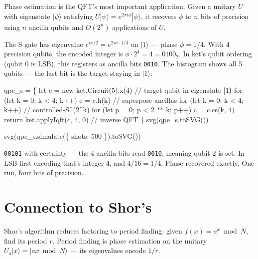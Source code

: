 \documentclass[
  11pt,
  letterpaper,
  oneside]{scrbook}
\newenvironment{Shaded}{\begin{snugshade}}{\end{snugshade}}
\newcommand{\NormalTok}[1]{\textcolor[rgb]{0.00,0.23,0.31}{#1}}
\begin{document}
Phase estimation is the QFT's most important application. Given a
unitary \(U\) with eigenstate \(|\psi\rangle\) satisfying
\(U|\psi\rangle = e^{2\pi i\phi}|\psi\rangle\), it recovers \(\phi\) to
\(n\) bits of precision using \(n\) ancilla qubits and \(O(2^n)\)
applications of \(U\).

The S gate has eigenvalue \(e^{i\pi/2} = e^{2\pi i \cdot 1/4}\) on
\(|1\rangle\) --- phase \(\phi = 1/4\). With 4 precision qubits, the
encoded integer is \(\phi \cdot 2^4 = 4 = 0100_2\). In ket's qubit
ordering (qubit 0 is LSB), this registers as ancilla bits \texttt{0010}.
The histogram shows all 5 qubits --- the last bit is the target staying
in \(|1\rangle\):

\begin{Shaded}
\begin{Highlighting}[]
\NormalTok{qpe\_s = \{}
\NormalTok{  let c = new ket.Circuit(5).x(4)             // target qubit in eigenstate |1⟩}
\NormalTok{  for (let k = 0; k \textless{} 4; k++) c = c.h(k)     // superpose ancillas}
\NormalTok{  for (let k = 0; k \textless{} 4; k++)                 // controlled{-}S\^{}(2\^{}k)}
\NormalTok{    for (let p = 0; p \textless{} 2 ** k; p++) c = c.cs(k, 4)}
\NormalTok{  return ket.applyIqft(c, 4, 0)               // inverse QFT}
\NormalTok{\}}
\NormalTok{svg(qpe\_s.toSVG())}
\end{Highlighting}
\end{Shaded}

\begin{Shaded}
\begin{Highlighting}[]
\NormalTok{svg(qpe\_s.simulate(\{ shots: 500 \}).toSVG())}
\end{Highlighting}
\end{Shaded}

\texttt{00101} with certainty --- the 4 ancilla bits read \texttt{0010},
meaning qubit 2 is set. In LSB-first encoding that's integer 4, and
\(4/16 = 1/4\). Phase recovered exactly. One run, four bits of
precision.

\section{Connection to Shor's}\label{connection-to-shors}

Shor's algorithm reduces factoring to period finding: given
\(f(x) = a^x \bmod N\), find its period \(r\). Period finding is phase
estimation on the unitary \(U_a|x\rangle = |ax \bmod N\rangle\) --- its
eigenvalues encode \(1/r\).
\end{document}
